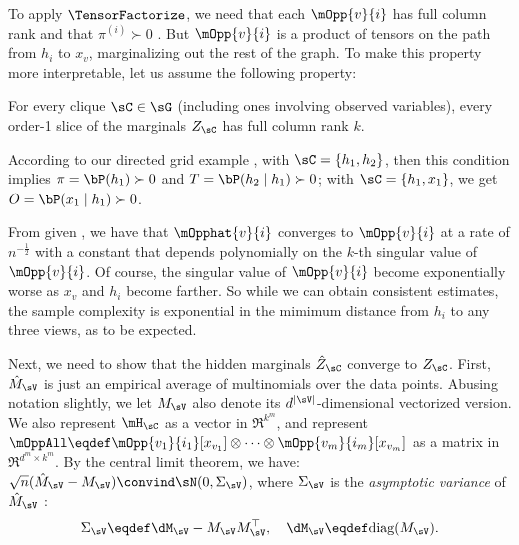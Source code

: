 To apply $\TensorFactorize$, we need that each $\mOpp{v}{i}$ has full column rank and that $\pi^{(i)} \succ 0$ .
But $\mOpp{v}{i}$ is a product of
tensors on the path from $h_i$ to $x_v$, marginalizing out the rest of the graph.
To make this property more interpretable, let us assume the following property:\verify
\begin{assumption} 
\label{asm:full-rank-plus}
For every clique $\sC \in \sG$ (including ones involving observed variables),
every order-1 slice of the marginals $Z_\sC$ has full column rank $k$.
\end{assumption}
According to our directed grid example , with $\sC = \{ h_1, h_2 \}$, then this condition implies
$\pi = \bP(h_1) \succ 0$ and 
$T = \bP(h_2 \mid h_1) \succ 0$;
with $\sC = \{ h_1, x_1 \}$, we get
$O = \bP(x_1 \mid h_1) \succ 0$.


From \cite{anandkumar13tensor} given ,
we have that $\mOpphat{v}{i}$ converges to $\mOpp{v}{i}$ at a rate of $n^{-\frac12}$ with a constant that
depends polynomially on the $k$-th singular value of $\mOpp{v}{i}$.
Of course, the singular value of $\mOpp{v}{i}$ become exponentially worse as $x_v$ and $h_i$ become farther.
So while we can obtain consistent estimates, the sample complexity
is exponential in the mimimum distance from $h_i$ to any three views, as to be expected.

Next, we need to show that the hidden marginals $\hat Z_\sC$ converge to $Z_\sC$.
First, $\hat M_\sV$ is just an empirical average of multinomials over the data points.
Abusing notation slightly, we let $M_\sV$ also denote its $d^{|\sV|}$-dimensional vectorized version.
We also represent $\mH_\sC$ as
  a vector in $\Re^{k^m}$, and represent $\mOppAll \eqdef
  \mOpp{v_1}{i_1} [x_{v_1}] \otimes \cdots \otimes
  \mOpp{v_m}{i_m} [x_{v_m}]$ as a matrix in $\Re^{d^m \times
  k^m}$.
By the central limit theorem, we have:
$\sqrt{n} (\hat M_\sV - M_\sV) \convind \sN(0, \Sigma_\sV)$,
where $\Sigma_\sV$ is the \emph{asymptotic variance} of $\hat M_\sV$ :
\begin{align*}
\Sigma_\sV \eqdef \dM_\sV - M_\sV M_\sV^\top, \quad \dM_\sV \eqdef \text{diag}(M_\sV).
\end{align*}

